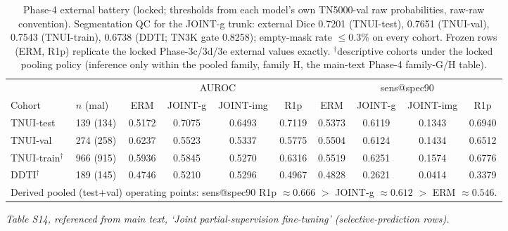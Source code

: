 \documentclass[11pt]{article}
\begin{document}
\begin{table}[!ht]
\centering\scriptsize
\setlength{\tabcolsep}{3pt}
\caption{Phase-4 external battery (locked; thresholds from each model's own
TN5000-val raw probabilities, raw-raw convention). Segmentation QC for the
JOINT-g trunk: external Dice 0.7201 (TNUI-test), 0.7651 (TNUI-val), 0.7543
(TNUI-train), 0.6738 (DDTI; TN3K gate 0.8258); empty-mask rate $\leq 0.3\%$
on every cohort. Frozen rows (ERM, R1p) replicate the locked Phase-3c/3d/3e
external values exactly. $^\dagger$descriptive cohorts under the locked
pooling policy (inference only within the pooled family, family H,
the main-text Phase-4 family-G/H table).}
\label{tab:phase4_external}
\begin{tabular}{llcccccccc}
\toprule
 & & \multicolumn{4}{c}{AUROC} & \multicolumn{4}{c}{sens@spec90} \\
\cmidrule(lr){3-6}\cmidrule(lr){7-10}
Cohort & $n$ (mal) & ERM & JOINT-g & JOINT-img & R1p & ERM & JOINT-g & JOINT-img & R1p \\
\midrule
TNUI-test  & 139 (134) & 0.5172 & 0.7075 & 0.6493 & 0.7119 & 0.5373 & 0.6119 & 0.1343 & 0.6940 \\
TNUI-val   & 274 (258) & 0.6237 & 0.5523 & 0.5337 & 0.5775 & 0.5504 & 0.6124 & 0.1434 & 0.6512 \\
TNUI-train$^\dagger$ & 966 (915) & 0.5936 & 0.5845 & 0.5270 & 0.6316 & 0.5519 & 0.6251 & 0.1574 & 0.6776 \\
DDTI$^\dagger$       & 189 (145) & 0.4746 & 0.5210 & 0.5296 & 0.4967 & 0.4828 & 0.2621 & 0.0414 & 0.3379 \\
\midrule
\multicolumn{10}{l}{Derived pooled (test+val) operating points: sens@spec90
R1p $\approx 0.666$ $>$ JOINT-g $\approx 0.612$ $>$ ERM $\approx 0.546$.}\\
\bottomrule
\end{tabular}
\end{table}

\noindent\emph{Table S14, referenced from main text, `Joint partial-supervision fine-tuning' (selective-prediction rows).}
\end{document}

